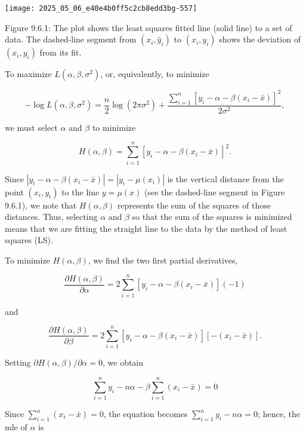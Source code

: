 \begin{center}
\texttt{[image: 2025\_05\_06\_e40e4b0ff5c2cb8edd3bg-557]}
\end{center}

Figure 9.6.1: The plot shows the least squares fitted line (solid line) to a set of data. The dashed-line segment from $\left(x_{i}, \hat{y}_{i}\right)$ to $\left(x_{i}, y_{i}\right)$ shows the deviation of $\left(x_{i}, y_{i}\right)$ from its fit.

To maximize $L\left(\alpha, \beta, \sigma^{2}\right)$, or, equivalently, to minimize

$$
-\log L\left(\alpha, \beta, \sigma^{2}\right)=\frac{n}{2} \log \left(2 \pi \sigma^{2}\right)+\frac{\sum_{i=1}^{n}\left[y_{i}-\alpha-\beta\left(x_{i}-\bar{x}\right)\right]^{2}}{2 \sigma^{2}},
$$

we must select $\alpha$ and $\beta$ to minimize

$$
H(\alpha, \beta)=\sum_{i=1}^{n}\left[y_{i}-\alpha-\beta\left(x_{i}-\bar{x}\right)\right]^{2} .
$$

Since $\left|y_{i}-\alpha-\beta\left(x_{i}-\bar{x}\right)\right|=\left|y_{i}-\mu\left(x_{i}\right)\right|$ is the vertical distance from the point $\left(x_{i}, y_{i}\right)$ to the line $y=\mu(x)$ (see the dashed-line segment in Figure 9.6.1), we note that $H(\alpha, \beta)$ represents the sum of the squares of those distances. Thus, selecting $\alpha$ and $\beta$ so that the sum of the squares is minimized means that we are fitting the straight line to the data by the method of least squares (LS).

To minimize $H(\alpha, \beta)$, we find the two first partial derivatives,

$$
\frac{\partial H(\alpha, \beta)}{\partial \alpha}=2 \sum_{i=1}^{n}\left[y_{i}-\alpha-\beta\left(x_{i}-\bar{x}\right)\right](-1)
$$

and

$$
\frac{\partial H(\alpha, \beta)}{\partial \beta}=2 \sum_{i=1}^{n}\left[y_{i}-\alpha-\beta\left(x_{i}-\bar{x}\right)\right]\left[-\left(x_{i}-\bar{x}\right)\right] .
$$

Setting $\partial H(\alpha, \beta) / \partial \alpha=0$, we obtain


\begin{equation*}
\sum_{i=1}^{n} y_{i}-n \alpha-\beta \sum_{i=1}^{n}\left(x_{i}-\bar{x}\right)=0 \tag{9.6.2}
\end{equation*}


Since $\sum_{i=1}^{n}\left(x_{i}-\bar{x}\right)=0$, the equation becomes $\sum_{i=1}^{n} y_{i}-n \alpha=0$; hence, the mle of $\alpha$ is


